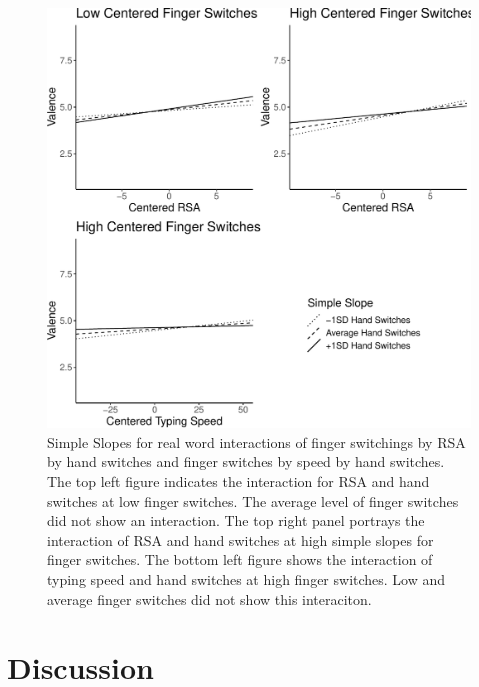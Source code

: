 \documentclass[
  english,
  man,mask]{apa7}
\begin{document}
\begin{figure}
\centering
\includegraphics{QWERTY_files/figure-latex/graphs2-1.pdf}
\caption{\label{fig:graphs2}Simple Slopes for real word interactions of finger switchings by RSA by hand switches and finger switches by speed by hand switches. The top left figure indicates the interaction for RSA and hand switches at low finger switches. The average level of finger switches did not show an interaction. The top right panel portrays the interaction of RSA and hand switches at high simple slopes for finger switches. The bottom left figure shows the interaction of typing speed and hand switches at high finger switches. Low and average finger switches did not show this interaciton.}
\end{figure}

\hypertarget{discussion}{%
\section{Discussion}\label{discussion}}
\end{document}
